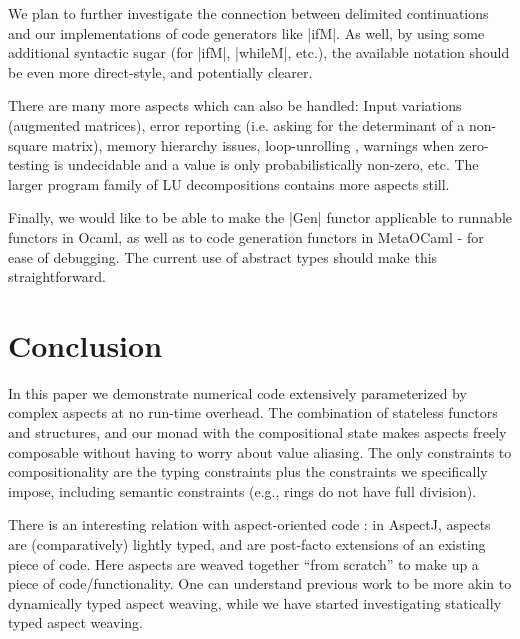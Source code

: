 \documentclass{llncs}
\begin{document}
We plan to further investigate the connection between delimited
continuations and our implementations of code generators like
|ifM|.  As well, by using some additional syntactic sugar
(for |ifM|, |whileM|, etc.), the available notation should be
even more direct-style, and potentially clearer.

There are many more aspects which can also be handled:
Input variations (augmented
matrices), error reporting (i.e. asking for the determinant of a 
non-square matrix), memory hierarchy issues, loop-unrolling
\cite{Padua:MetaOcaml:04},
warnings when zero-testing is undecidable and
a value is only probabilistically non-zero, etc.  The larger program
family of LU decompositions contains more aspects still.

Finally, we would like to be able to make the |Gen| functor applicable
to runnable functors in Ocaml, as well as to code generation functors
in MetaOCaml - for ease of debugging.  The current use of abstract
types should make this straightforward.

\section{Conclusion}\label{conclusion}
In this paper we demonstrate numerical code extensively parameterized
by complex aspects at no run-time overhead.  The combination of
stateless functors and structures, and our monad with the
compositional state makes aspects freely composable without having to
worry about value aliasing. The only constraints to compositionality
are the typing constraints plus the constraints we specifically
impose, including semantic constraints (e.g., rings do not have full
division).

There is an interesting relation with aspect-oriented code
\cite{kiczales97aspectoriented}: in AspectJ, 
aspects are (comparatively) lightly typed, and are post-facto extensions of an
existing piece of code.  Here aspects are weaved together ``from scratch'' to
make up a piece of code/functionality.  One can understand previous work to be
more akin to dynamically typed aspect weaving, while we have started
investigating statically typed aspect weaving.



\end{document}
